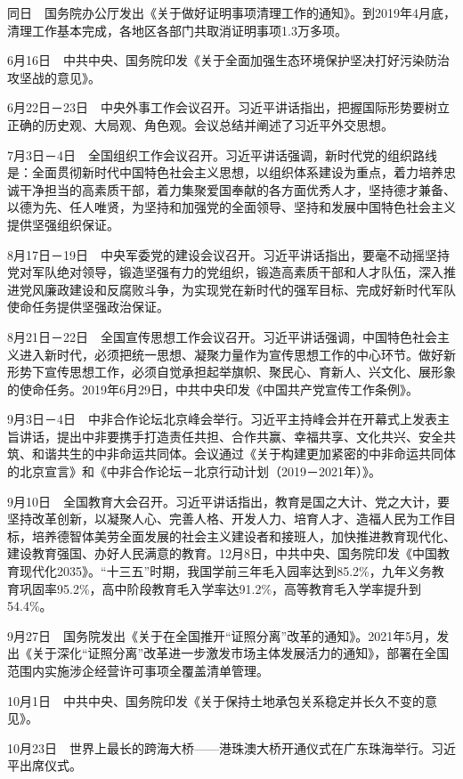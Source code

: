 \documentclass[10pt,a4paper,twocolumn]{book}
\begin{document}
同日　国务院办公厅发出《关于做好证明事项清理工作的通知》。到2019年4月底，清理工作基本完成，各地区各部门共取消证明事项1.3万多项。

6月16日　中共中央、国务院印发《关于全面加强生态环境保护坚决打好污染防治攻坚战的意见》。

6月22日－23日　中央外事工作会议召开。习近平讲话指出，把握国际形势要树立正确的历史观、大局观、角色观。会议总结并阐述了习近平外交思想。

7月3日－4日　全国组织工作会议召开。习近平讲话强调，新时代党的组织路线是：全面贯彻新时代中国特色社会主义思想，以组织体系建设为重点，着力培养忠诚干净担当的高素质干部，着力集聚爱国奉献的各方面优秀人才，坚持德才兼备、以德为先、任人唯贤，为坚持和加强党的全面领导、坚持和发展中国特色社会主义提供坚强组织保证。

8月17日－19日　中央军委党的建设会议召开。习近平讲话指出，要毫不动摇坚持党对军队绝对领导，锻造坚强有力的党组织，锻造高素质干部和人才队伍，深入推进党风廉政建设和反腐败斗争，为实现党在新时代的强军目标、完成好新时代军队使命任务提供坚强政治保证。

8月21日－22日　全国宣传思想工作会议召开。习近平讲话强调，中国特色社会主义进入新时代，必须把统一思想、凝聚力量作为宣传思想工作的中心环节。做好新形势下宣传思想工作，必须自觉承担起举旗帜、聚民心、育新人、兴文化、展形象的使命任务。2019年6月29日，中共中央印发《中国共产党宣传工作条例》。

9月3日－4日　中非合作论坛北京峰会举行。习近平主持峰会并在开幕式上发表主旨讲话，提出中非要携手打造责任共担、合作共赢、幸福共享、文化共兴、安全共筑、和谐共生的中非命运共同体。会议通过《关于构建更加紧密的中非命运共同体的北京宣言》和《中非合作论坛－北京行动计划（2019－2021年）》。

9月10日　全国教育大会召开。习近平讲话指出，教育是国之大计、党之大计，要坚持改革创新，以凝聚人心、完善人格、开发人力、培育人才、造福人民为工作目标，培养德智体美劳全面发展的社会主义建设者和接班人，加快推进教育现代化、建设教育强国、办好人民满意的教育。12月8日，中共中央、国务院印发《中国教育现代化2035》。“十三五”时期，我国学前三年毛入园率达到85.2\%，九年义务教育巩固率95.2\%，高中阶段教育毛入学率达91.2\%，高等教育毛入学率提升到54.4\%。

9月27日　国务院发出《关于在全国推开“证照分离”改革的通知》。2021年5月，发出《关于深化“证照分离”改革进一步激发市场主体发展活力的通知》，部署在全国范围内实施涉企经营许可事项全覆盖清单管理。

10月1日　中共中央、国务院印发《关于保持土地承包关系稳定并长久不变的意见》。

10月23日　世界上最长的跨海大桥——港珠澳大桥开通仪式在广东珠海举行。习近平出席仪式。
\end{document}
